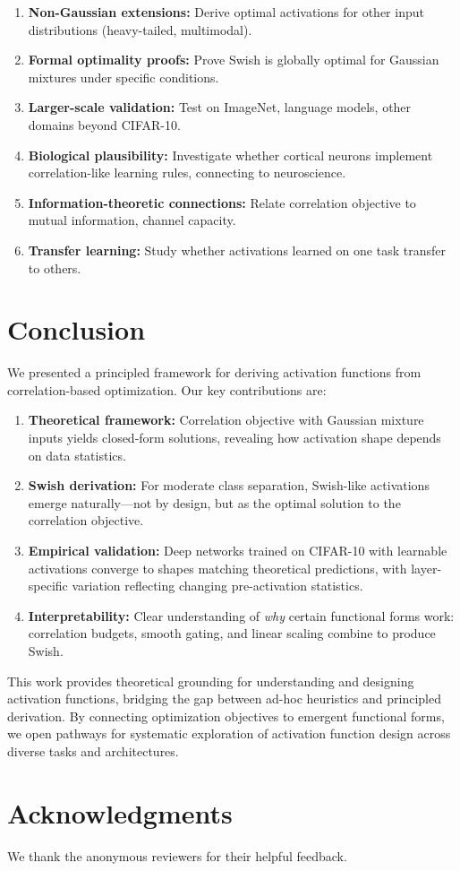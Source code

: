 \documentclass{article}
\begin{document}
\begin{enumerate}
\item \textbf{Non-Gaussian extensions:} Derive optimal activations for other input distributions (heavy-tailed, multimodal).
\item \textbf{Formal optimality proofs:} Prove Swish is globally optimal for Gaussian mixtures under specific conditions.
\item \textbf{Larger-scale validation:} Test on ImageNet, language models, other domains beyond CIFAR-10.
\item \textbf{Biological plausibility:} Investigate whether cortical neurons implement correlation-like learning rules, connecting to neuroscience.
\item \textbf{Information-theoretic connections:} Relate correlation objective to mutual information, channel capacity.
\item \textbf{Transfer learning:} Study whether activations learned on one task transfer to others.
\end{enumerate}

\section{Conclusion}
\label{sec:conclusion}

We presented a principled framework for deriving activation functions from correlation-based optimization. Our key contributions are:

\begin{enumerate}
\item \textbf{Theoretical framework:} Correlation objective with Gaussian mixture inputs yields closed-form solutions, revealing how activation shape depends on data statistics.
\item \textbf{Swish derivation:} For moderate class separation, Swish-like activations emerge naturally—not by design, but as the optimal solution to the correlation objective.
\item \textbf{Empirical validation:} Deep networks trained on CIFAR-10 with learnable activations converge to shapes matching theoretical predictions, with layer-specific variation reflecting changing pre-activation statistics.
\item \textbf{Interpretability:} Clear understanding of \textit{why} certain functional forms work: correlation budgets, smooth gating, and linear scaling combine to produce Swish.
\end{enumerate}

This work provides theoretical grounding for understanding and designing activation functions, bridging the gap between ad-hoc heuristics and principled derivation. By connecting optimization objectives to emergent functional forms, we open pathways for systematic exploration of activation function design across diverse tasks and architectures.

\section*{Acknowledgments}
We thank the anonymous reviewers for their helpful feedback.



\end{document}
